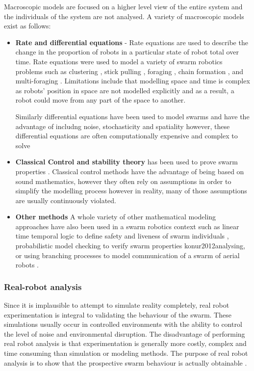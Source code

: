 Macroscopic models are focused on a higher level view of the entire system and the individuals of the system are not analysed. A variety of macroscopic models exist as follows: 
\begin{itemize}
	\item \textbf{Rate and differential equations} - Rate equations are used to describe the change in the proportion of robots in a particular state of robot total over time. Rate equations were used to model a variety of swarm robotics problems such as  clustering \cite{martinoli1999understanding}, stick pulling \cite{lerman2001macroscopic}, foraging \cite{lerman2002mathematical}, chain formation \cite{trianni2002modeling}, and multi-foraging \cite{campo2007efficient}. Limitations include that modelling space and time is complex as robots' position in space are not modelled explicitly and as a result, a robot could move from any part of the space to another.

Similarly differential equations have been used to model swarms and have the advantage of includng noise, stochasticity and spatiality however, these differential equations are often computationally expensive and complex to solve \cite{hamann2008framework, prorok2011multi}

	\item \textbf{Classical Control and stability theory} has been used to prove swarm properties \cite{gazi2005stability,liu2004stable, schwager2011time}. Classical control methods have the advantage of being based on sound mathematics, however they often rely on assumptions in order to simplify the modelling process however in reality, many of those assumptions are usually continuously violated.
	\item \textbf{Other methods}
	A whole variety of other mathematical modeling approaches have also been used in a swarm robotics context such as linear time temporal logic to define safety and liveness of swarm individuals \cite{winfield2005formal}, probabilistic model checking to verify swarm properties {konur2012analysing}, or using branching processes to model communication of a swarm of aerial robots \cite{mathews2010establishing}. 
\end{itemize}

\subsubsection{Real-robot analysis}

Since it is implausible to attempt to simulate reality completely, real robot experimentation is integral to validating the behaviour of the swarm. These simulations usually occur in controlled environments with the ability to control the level of noise and environmental disruption. 
The disadvantage of performing real robot analysis is that experimentation is generally more costly, complex and time consuming than simulation or modeling methods. The purpose of real robot analysis is to show that the prospective swarm behaviour is actually obtainable \cite{brambilla2013swarm}.

